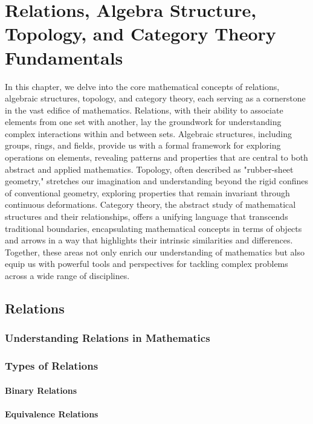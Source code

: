 \chapterspaceabove{6.75cm} 
\chapterspacebelow{7.25cm} 
\chapter{Relations, Algebra Structure, Topology, and Category Theory Fundamentals}
In this chapter, we delve into the core mathematical concepts of relations, algebraic structures, topology, and category theory, each serving as a cornerstone in the vast edifice of mathematics. Relations, with their ability to associate elements from one set with another, lay the groundwork for understanding complex interactions within and between sets. Algebraic structures, including groups, rings, and fields, provide us with a formal framework for exploring operations on elements, revealing patterns and properties that are central to both abstract and applied mathematics. Topology, often described as "rubber-sheet geometry," stretches our imagination and understanding beyond the rigid confines of conventional geometry, exploring properties that remain invariant through continuous deformations. Category theory, the abstract study of mathematical structures and their relationships, offers a unifying language that transcends traditional boundaries, encapsulating mathematical concepts in terms of objects and arrows in a way that highlights their intrinsic similarities and differences. Together, these areas not only enrich our understanding of mathematics but also equip us with powerful tools and perspectives for tackling complex problems across a wide range of disciplines.

\section{Relations}
\lipsum
\subsection{Understanding Relations in Mathematics}
\subsection{Types of Relations}
\subsubsection{Binary Relations}
\subsubsection{Equivalence Relations}
